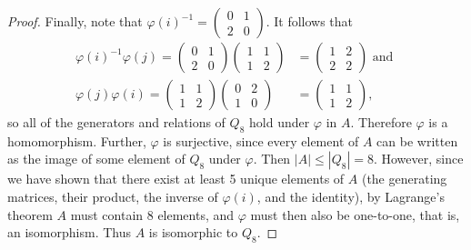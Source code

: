 \documentclass{article}
\begin{document}
\begin{proof}
    Finally, note that $\varphi(i)^{-1} = \begin{pmatrix}0 & 1 \\ 2 & 0\end{pmatrix}$. It follows that
    \begin{align*}
        \varphi(i)^{-1} \varphi(j) = \begin{pmatrix}0 & 1 \\ 2 & 0\end{pmatrix}\begin{pmatrix}1 & 1 \\ 1 & 2\end{pmatrix} &= \begin{pmatrix}1 & 2 \\ 2 & 2\end{pmatrix} \text{ and } \\ 
        \varphi(j)\varphi(i) = \begin{pmatrix}1 & 1 \\ 1 & 2\end{pmatrix}\begin{pmatrix}0 & 2 \\ 1 & 0\end{pmatrix} &= \begin{pmatrix}1 & 1 \\ 1 & 2\end{pmatrix},
    \end{align*}
    so all of the generators and relations of $Q_8$ hold under $\varphi$ in $A$. Therefore $\varphi$ is a homomorphism. Further, $\varphi$ is surjective, since every element of $A$ can be written as the image of some element of $Q_8$ under $\varphi$. Then $|A| \leq |Q_8| = 8$. However, since we have shown that there exist at least 5 unique elements of $A$ (the generating matrices, their product, the inverse of $\varphi(i)$, and the identity), by Lagrange's theorem $A$ must contain 8 elements, and $\varphi$ must then also be one-to-one, that is, an isomorphism. Thus $A$ is isomorphic to $Q_8$.
\end{proof}
\end{document}
